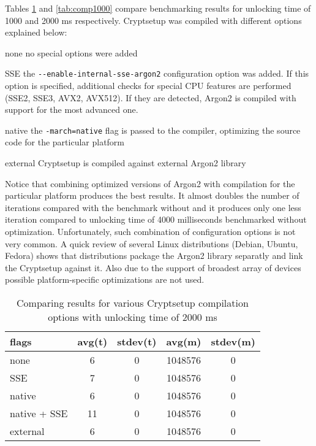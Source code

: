 \documentclass[nolof]{fithesis3}
\begin{document}
\FloatBarrier

Tables \ref{tab:comp2000} and \ref{tab:comp1000} compare benchmarking results for unlocking time of 1000 and 2000 ms respectively. Cryptsetup was compiled with different options explained below:

\begin{description}
\item{none} no special options were added
\item{SSE} the \verb+--enable-internal-sse-argon2+ configuration option was added. If this option is specified, additional checks for special CPU features are performed (SSE2, SSE3, AVX2, AVX512). If they are detected, Argon2 is compiled with support for the most advanced one.

\item{native} the \verb+-march=native+ flag is passed to the compiler, optimizing the source code for the particular platform

\item{external} Cryptsetup is compiled against external Argon2 library
\end{description}

Notice that combining optimized versions of Argon2 with compilation for the particular platform produces the best results. It almost doubles the number of iterations compared with the benchmark without and it produces only one less iteration compared to unlocking time of 4000 milliseconds benchmarked without optimization. Unfortunately, such combination of configuration options is not very common. A quick review of several Linux distributions (Debian, Ubuntu, Fedora) shows that distributions package the Argon2 library separatly and link the Cryptsetup against it. Also due to the support of broadest array of devices possible platform-specific optimizations are not used.


\noindent
\begin{table}
\caption{Comparing results for various Cryptsetup compilation options with unlocking time of 2000 ms}
\label{tab:comp2000}
\begin{tabularx}{\textwidth}{| l | c | c | c | c |}
\hline
flags & avg(t) & stdev(t) & avg(m) & stdev(m)\\
\hline
none & 6 & 0 & 1048576 & 0\\
\hline
SSE & 7 & 0 & 1048576 & 0\\
\hline
native & 6 & 0 & 1048576 & 0\\
\hline
native + SSE & 11 & 0 & 1048576 & 0\\
\hline
external & 6 & 0 & 1048576 & 0\\
\hline
\end{tabularx}
\end{table}
\end{document}
